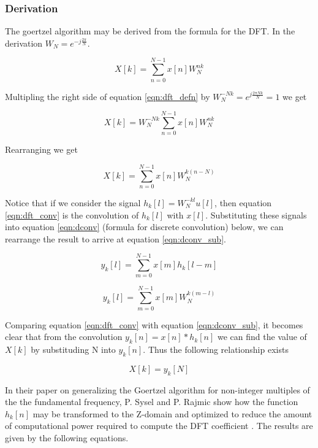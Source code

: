 \subsubsection{Derivation}
The goertzel algorithm may be derived from the formula for the DFT. In the derivation \(W_N = e^{-j\frac{2\pi}{N}}\).

\begin{equation}
	\label{eqn:dft_defn}
	X[k] = \sum_{n=0}^{N-1}x[n]W_{N}^{nk}
\end{equation}

Multipling the right side of equation \ref{eqn:dft_defn} by \(W_{N}^{-Nk} = e^{j\frac{2\pi N k}{N}} = 1\) we get

\begin{equation}
X[k] = W_{N}^{-Nk}\sum_{n=0}^{N-1}x[n]W_{N}^{nk}
\end{equation}

Rearranging we get

\begin{equation}
\label{eqn:dft_conv}
X[k] = \sum_{n=0}^{N-1}x[n]W_{N}^{k(n-N)}
\end{equation}

Notice that if we consider the signal \(h_k[l] = W_N^{-kl}u[l]\), then equation \ref{eqn:dft_conv} is the convolution of $h_k[l]$ with $x[l]$. Substituting these signals into equation \ref{eqn:dconv} (formula for discrete convolution) below, we can rearrange the result to arrive at equation \ref{eqn:dconv_sub}.

\begin{equation}
	\label{eqn:dconv}
	y_k[l] = \sum_{m=0}^{N-1}x[m]h_k[l - m]
\end{equation}

\begin{equation}
	\label{eqn:dconv_sub}
y_k[l] = \sum_{m=0}^{N-1}x[m]W_N^{k(m-l)}
\end{equation}

Comparing equation \ref{eqn:dft_conv} with equation \ref{eqn:dconv_sub}, it becomes clear that from the convolution $y_k[n] = x[n] * h_k[n]$ we can find the value of $X[k]$ by substituding N into $y_k[n]$. Thus the following relationship exists

\begin{equation}
\label{eqn:goertzel_relationship}
X[k] = y_k[N]
\end{equation}


In their paper on generalizing the Goertzel algorithm for non-integer multiples of the the fundamental frequency, P. Sysel and P. Rajmic show how the function $h_k[n]$ may be transformed to the Z-domain and optimized to reduce the amount of computational power required to compute the DFT coefficient \cite{Sysel2012}. The results are given by the following equations.

